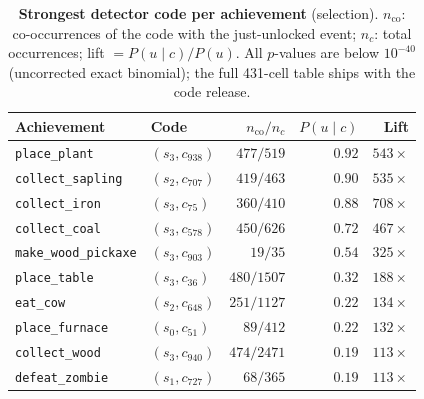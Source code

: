 \documentclass[11pt]{article}
\newcommand{\code}[2]{(s_{#1},c_{#2})}
\newcommand{\achname}[1]{\texttt{#1}}
\begin{document}
\clearpage
\begin{table}[h]
\centering
\caption{\textbf{Strongest detector code per achievement} (selection). $n_{\mathrm{co}}$: co-occurrences of the code with the just-unlocked event; $n_c$: total occurrences; lift $=P(u\mid c)/P(u)$. All $p$-values are below $10^{-40}$ (uncorrected exact binomial); the full 431-cell table ships with the code release.}\label{stab:mi}
\begin{tabular}{@{}llrrr@{}}
\toprule
Achievement & Code & $n_{\mathrm{co}}/n_c$ & $P(u \mid c)$ & Lift \\
\midrule
\achname{place\_plant}        & $\code{3}{938}$ & $477/519$  & $0.92$ & $543\times$ \\
\achname{collect\_sapling}    & $\code{2}{707}$ & $419/463$  & $0.90$ & $535\times$ \\
\achname{collect\_iron}       & $\code{3}{75}$  & $360/410$  & $0.88$ & $708\times$ \\
\achname{collect\_coal}       & $\code{3}{578}$ & $450/626$  & $0.72$ & $467\times$ \\
\achname{make\_wood\_pickaxe} & $\code{3}{903}$ & $19/35$    & $0.54$ & $325\times$ \\
\achname{place\_table}        & $\code{3}{36}$  & $480/1507$ & $0.32$ & $188\times$ \\
\achname{eat\_cow}            & $\code{2}{648}$ & $251/1127$ & $0.22$ & $134\times$ \\
\achname{place\_furnace}      & $\code{0}{51}$  & $89/412$   & $0.22$ & $132\times$ \\
\achname{collect\_wood}       & $\code{3}{940}$ & $474/2471$ & $0.19$ & $113\times$ \\
\achname{defeat\_zombie}      & $\code{1}{727}$ & $68/365$   & $0.19$ & $113\times$ \\
\bottomrule
\end{tabular}
\end{table}
\end{document}
